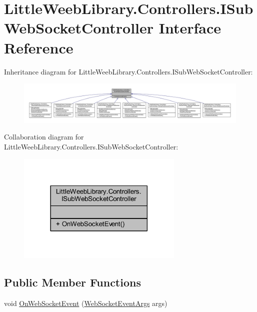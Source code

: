\hypertarget{interface_little_weeb_library_1_1_controllers_1_1_i_sub_web_socket_controller}{}\section{Little\+Weeb\+Library.\+Controllers.\+I\+Sub\+Web\+Socket\+Controller Interface Reference}
\label{interface_little_weeb_library_1_1_controllers_1_1_i_sub_web_socket_controller}


Inheritance diagram for Little\+Weeb\+Library.\+Controllers.\+I\+Sub\+Web\+Socket\+Controller\+:\nopagebreak
\begin{figure}[H]
\begin{center}
\leavevmode
\includegraphics[width=350pt]{interface_little_weeb_library_1_1_controllers_1_1_i_sub_web_socket_controller__inherit__graph}
\end{center}
\end{figure}


Collaboration diagram for Little\+Weeb\+Library.\+Controllers.\+I\+Sub\+Web\+Socket\+Controller\+:\nopagebreak
\begin{figure}[H]
\begin{center}
\leavevmode
\includegraphics[width=225pt]{interface_little_weeb_library_1_1_controllers_1_1_i_sub_web_socket_controller__coll__graph}
\end{center}
\end{figure}
\subsection*{Public Member Functions}
\begin{DoxyCompactItemize}
\item 
void \mbox{\hyperlink{interface_little_weeb_library_1_1_controllers_1_1_i_sub_web_socket_controller_adcb26b7b397d6a67ccbf114008c29985}{On\+Web\+Socket\+Event}} (\mbox{\hyperlink{class_little_weeb_library_1_1_event_arguments_1_1_web_socket_event_args}{Web\+Socket\+Event\+Args}} args)
\end{DoxyCompactItemize}


